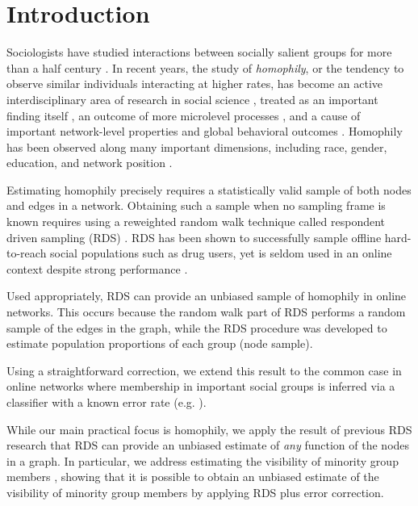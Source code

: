 \documentclass[a4paper]{article}
\begin{document}
\section{Introduction}

Sociologists have studied interactions between socially salient groups for more than a half century \cite{coleman_relational_1958}. In recent years, the study of \emph{homophily}, or the tendency to observe similar individuals interacting at higher rates, has become an active interdisciplinary area of research in social science \cite{mcpherson_birds_2001}, treated as an important finding itself \cite{marsden_core_1987,lewis_tastes_2008}, an outcome of more microlevel processes \cite{currarini_economic_2009,bramoulle_homophily_2012}, and a cause of important network-level properties \cite{barabasi_emergence_1999} and global behavioral outcomes \cite{}. Homophily has been observed along many important dimensions, including race, gender, education, and network position \cite{}.

Estimating homophily precisely requires a statistically valid sample of both nodes and edges in a network. Obtaining such a sample when no sampling frame is known requires using a reweighted random walk technique called respondent driven sampling (RDS) \cite{heckathorn_respondent-driven_2002}. RDS has been shown to successfully sample offline hard-to-reach social populations such as drug users, yet is seldom used in an online context despite strong performance \cite{ribeiro_estimating_2010}.

Used appropriately, RDS can provide an unbiased sample of homophily in online networks. This occurs because the random walk part of RDS performs a random sample of the edges in the graph, while the RDS procedure was developed to estimate population proportions of each group (node sample).

Using a straightforward correction, we extend this result to the common case in online networks where membership in important social groups is inferred via a classifier with a known error rate (e.g. \cite{barbera_less_2016}).

While our main practical focus is homophily, we apply the result of previous RDS research \cite{goel_respondent-driven_2009} that RDS can provide an unbiased estimate of \emph{any} function of the nodes in a graph. In particular, we address estimating the visibility of minority group members \cite{karimi_visibility_2017}, showing that it is possible to obtain an unbiased estimate of the visibility of minority group members by applying RDS plus error correction.
\end{document}
